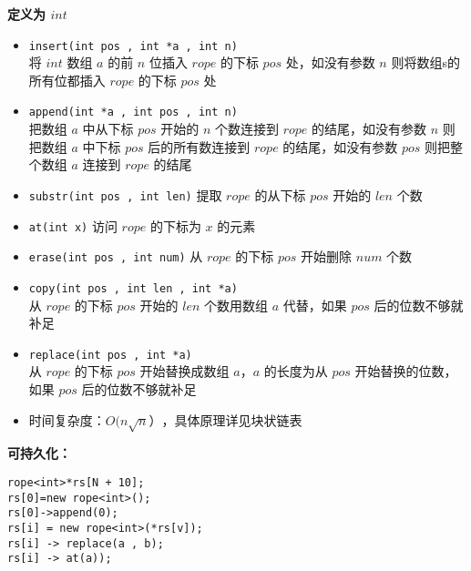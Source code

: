 \documentclass[C:/Users/12748/Desktop/latex模板/main/main.tex]{subfiles}
\begin{document}
\textbf{定义为 \(int\)}

\begin{itemize}
\item
  \texttt{insert(int\ pos\ ,\ int\ *a\ ,\ int\ n)} ~\\
  将 \(int\) 数组 \(a\) 的前 \(n\) 位插入 \(rope\) 的下标 \(pos\)
  处，如没有参数 \(n\) 则将数组s的所有位都插入 \(rope\) 的下标 \(pos\)
  处
\item
  \texttt{append(int\ *a\ ,\ int\ pos\ ,\ int\ n)}~\\
  把数组 \(a\) 中从下标 \(pos\) 开始的 \(n\) 个数连接到 \(rope\)
  的结尾，如没有参数 \(n\) 则把数组 \(a\) 中下标 \(pos\)
  后的所有数连接到 \(rope\) 的结尾，如没有参数 \(pos\) 则把整个数组
  \(a\) 连接到 \(rope\) 的结尾
\item
  \texttt{substr(int\ pos\ ,\ int\ len)} 提取 \(rope\) 的从下标 \(pos\)
  开始的 \(len\) 个数
\item
  \texttt{at(int\ x)} 访问 \(rope\) 的下标为 \(x\) 的元素
\item
  \texttt{erase(int\ pos\ ,\ int\ num)} 从 \(rope\) 的下标 \(pos\)
  开始删除 \(num\) 个数
\item
  \texttt{copy(int\ pos\ ,\ int\ len\ ,\ int\ *a)} ~\\
  从 \(rope\) 的下标 \(pos\) 开始的 \(len\) 个数用数组 \(a\) 代替，如果
  \(pos\) 后的位数不够就补足
\item
  \texttt{replace(int\ pos\ ,\ int\ *a)} ~\\
  从 \(rope\) 的下标 \(pos\) 开始替换成数组 \(a\)，\(a\) 的长度为从
  \(pos\) 开始替换的位数，如果 \(pos\) 后的位数不够就补足
\item
  时间复杂度：\(O(n\sqrt{n}）\)，具体原理详见块状链表
\end{itemize}

\textbf{可持久化：}

\begin{verbatim}
rope<int>*rs[N + 10];
rs[0]=new rope<int>();
rs[0]->append(0);
rs[i] = new rope<int>(*rs[v]);
rs[i] -> replace(a , b);
rs[i] -> at(a));
\end{verbatim}
\end{document}
